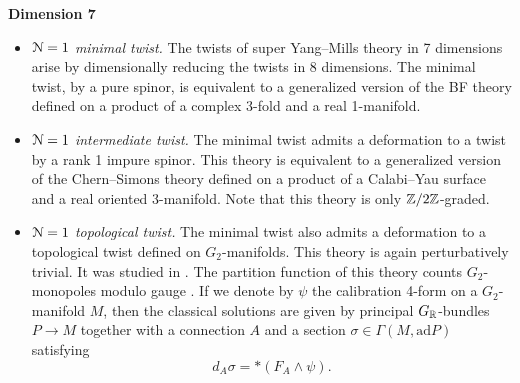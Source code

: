 \documentclass[10pt, oneside]{article}
\begin{document}
\textbf{Dimension 7}
\begin{itemize}
 \item \emph{$\mathcal{N}=1$ minimal twist.} The twists of super Yang--Mills theory in 7 dimensions arise by dimensionally reducing the twists in 8 dimensions.  The minimal twist, by a pure spinor, is equivalent to a generalized version of the BF theory defined on a product of a complex 3-fold and a real 1-manifold.
 \item \emph{$\mathcal{N}=1$ intermediate twist.} The minimal twist admits a deformation to a twist by a rank 1 impure spinor. This theory is equivalent to a generalized version of the Chern--Simons theory defined on a product of a Calabi--Yau surface and a real oriented 3-manifold. Note that this theory is only $\mathbb Z/2\mathbb Z$-graded.
 \item \emph{$\mathcal{N}=1$ topological twist.} The minimal twist also admits a deformation to a topological twist defined on $G_2$-manifolds. This theory is again perturbatively trivial. It was studied in \cite{AcharyaOLoughlinSpence, BaulieuKannoSinger}. The partition function of this theory counts $G_2$-monopoles modulo gauge \cite{DonaldsonSegal}. If we denote by $\psi$ the calibration 4-form on a $G_2$-manifold $M$, then the classical solutions are given by principal $G_\mathbb R$-bundles $P\rightarrow M$ together with a connection $A$ and a section $\sigma\in\Gamma(M, \mathrm{ad} P)$ satisfying
\[d_A\sigma = \ast(F_A\wedge \psi).\] 
\end{itemize}
\end{document}

